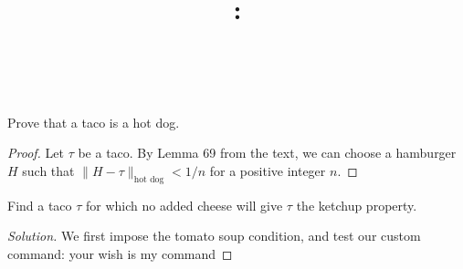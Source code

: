 \documentclass[12pt]{article}
\title{\large\COURSENUMB:\\\COURSENAME\\\ASSIGNMENTNAME}
\author{\MYNAME}
\date{\SUBMISSIONDATE}
\newcommand{\foo}{your wish is my command}
\begin{document}
\maketitle


\begin{exercise}
	Prove that a taco is a hot dog.
\end{exercise}

\begin{proof}
	Let $\tau$ be a taco. By Lemma 69 from the text, we can choose
	a hamburger $H$ such that $\|H-\tau\|_{\text{hot dog}}<1/n$
	for a positive integer $n$.
\end{proof}


\begin{exercise}
	Find a taco $\tau$ for which no added cheese will give $\tau$ the
	ketchup property.
\end{exercise}

\begin{proof}
	[Solution]

	We first impose the tomato soup condition,
	and test our custom command: \foo

\end{proof}
\end{document}
